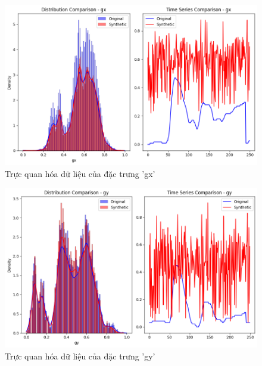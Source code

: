 \begin{figure}[H]
    \centering
    \includegraphics[width=1\textwidth]{Images/Improvement results/TimeGAN_gx.png}
    \caption{Trực quan hóa dữ liệu của đặc trưng 'gx'}
    \label{fig:timegan_data_gx}
\end{figure}

\begin{figure}[H]
    \centering
    \includegraphics[width=1\textwidth]{Images/Improvement results/TimeGAN_gy.png}
    \caption{Trực quan hóa dữ liệu của đặc trưng 'gy'}
    \label{fig:timegan_data_gy}
\end{figure}

